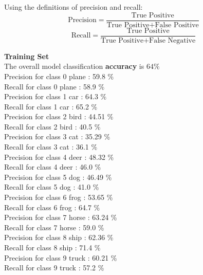 \documentclass[submit]{harvardml}
\begin{document}
\begin{enumerate}
    
    Using the definitions of precision and recall:
    $$
        \text{Precision} = \frac{\text{True Positive}}{\text{True Positive} + \text{False Positive}}
    $$  
    $$
        \text{Recall} = \frac{\text{True Positive}}{\text{True Positive} + \text{False Negative}}
    $$  
    
    \textbf{Training Set} \\
    The overall model classification \textbf{accuracy} is $64\%$\\
	Precision for class 0 plane : 59.8 \% \\
    Recall for class 0 plane : 58.9 \% \\
    Precision for class 1 car : 64.3 \% \\
    Recall for class 1 car : 65.2 \% \\
    Precision for class 2 bird : 44.51 \% \\
    Recall for class 2 bird : 40.5 \% \\
    Precision for class 3 cat : 35.29 \% \\
    Recall for class 3 cat : 36.1 \% \\
    Precision for class 4 deer : 48.32 \% \\
    Recall for class 4 deer : 46.0 \% \\
    Precision for class 5 dog : 46.49 \% \\
    Recall for class 5 dog : 41.0 \% \\
    Precision for class 6 frog : 53.65 \% \\
    Recall for class 6 frog : 64.7 \% \\
    Precision for class 7 horse : 63.24 \% \\
    Recall for class 7 horse : 59.0 \% \\
    Precision for class 8 ship : 62.36 \% \\
    Recall for class 8 ship : 71.4 \% \\
    Precision for class 9 truck : 60.21 \% \\
    Recall for class 9 truck : 57.2 \% \\
    

\end{enumerate}
\end{document}
